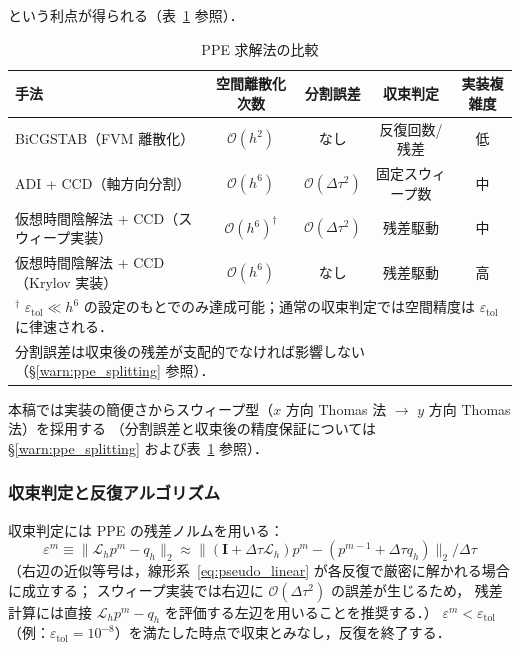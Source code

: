 という利点が得られる（表~\ref{tab:ppe_methods} 参照）．

\begin{table}[ht]
\centering
\small
\caption{PPE 求解法の比較}
\label{tab:ppe_methods}
\begin{tabular}{lcccc}
\hline
手法 & 空間離散化次数 & 分割誤差 & 収束判定 & 実装複雑度 \\
\hline
BiCGSTAB（FVM 離散化） & $\mathcal{O}(h^2)$ & なし & 反復回数/残差 & 低 \\
ADI + CCD（軸方向分割） & $\mathcal{O}(h^6)$ & $\mathcal{O}(\Delta\tau^2)$ & 固定スウィープ数 & 中 \\
仮想時間陰解法 + CCD（スウィープ実装）& $\mathcal{O}(h^6)^{\dagger}$ & $\mathcal{O}(\Delta\tau^2)$ & 残差駆動 & 中 \\
仮想時間陰解法 + CCD（Krylov 実装） & $\mathcal{O}(h^6)$ & なし & 残差駆動 & 高 \\
\hline
\multicolumn{5}{l}{$^{\dagger}$ $\varepsilon_\mathrm{tol} \ll h^6$ の設定のもとでのみ達成可能；通常の収束判定では空間精度は $\varepsilon_\mathrm{tol}$ に律速される．}\\
\multicolumn{5}{l}{\phantom{$^{\dagger}$} 分割誤差は収束後の残差が支配的でなければ影響しない（§\ref{warn:ppe_splitting} 参照）．}
\end{tabular}
\end{table}

本稿では実装の簡便さからスウィープ型（$x$ 方向 Thomas 法 $\to$ $y$ 方向 Thomas 法）を採用する
（分割誤差と収束後の精度保証については §\ref{warn:ppe_splitting} および表~\ref{tab:ppe_methods} 参照）．

\subsubsection{収束判定と反復アルゴリズム}

収束判定には PPE の残差ノルムを用いる：
\begin{equation}
  \varepsilon^m \equiv \bigl\|\mathcal{L}_h p^m - q_h\bigr\|_2
  \approx \bigl\|(\mathbf{I}+\Delta\tau\mathcal{L}_h)p^m - (p^{m-1}+\Delta\tau q_h)\bigr\|_2 \big/ \Delta\tau
  \label{eq:residual}
\end{equation}
（右辺の近似等号は，線形系~\eqref{eq:pseudo_linear} が各反復で厳密に解かれる場合に成立する；
スウィープ実装では右辺に $\mathcal{O}(\Delta\tau^2)$ の誤差が生じるため，
残差計算には直接 $\mathcal{L}_h p^m - q_h$ を評価する左辺を用いることを推奨する．）
$\varepsilon^m < \varepsilon_{\mathrm{tol}}$（例：$\varepsilon_{\mathrm{tol}} = 10^{-8}$）を満たした時点で収束とみなし，反復を終了する．

